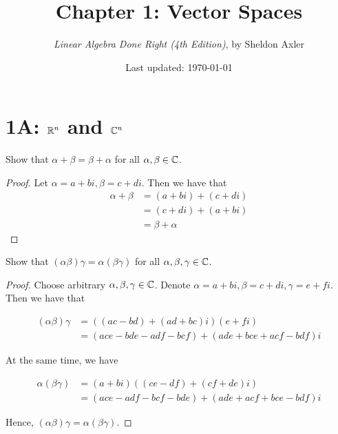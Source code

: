 \documentclass{extarticle}
\title{\vspace{-2em}Chapter 1: Vector Spaces}
\author{\emph{Linear Algebra Done Right (4th Edition)}, by Sheldon Axler}
\date{Last updated: \today}
\begin{document}
\maketitle 
\tableofcontents
\newpage

\section*{1A: $\mathbb{R}^n$ and $\mathbb{C}^n$}

\begin{problem}{1}
    Show that \(\alpha + \beta = \beta + \alpha\) for all \(\alpha, 
    \beta \in \mathbb{C}\). 
\end{problem}

\begin{proof}
    Let \(\alpha = a + bi, \beta = c + di\). Then we have that 
    \begin{align*}
        \alpha + \beta 
        &= (a + bi) + (c + di) \\ 
        &= (c + di) + (a + bi) \\ 
        &= \beta + \alpha
    \end{align*}
\end{proof}

\begin{problem}{3}
    Show that \((\alpha \beta) \gamma = \alpha(\beta \gamma)\) for all \(\alpha,
    \beta, \gamma \in \mathbb{C}\). 
\end{problem}

\begin{proof}
Choose arbitrary \(\alpha, \beta, \gamma \in \mathbb{C}\). Denote \(\alpha = a + bi,
\beta=c + di, \gamma = e + fi\). Then we have that 

\begin{align*}
    (\alpha \beta) \gamma 
    &= ((ac - bd) + (ad + bc)i ) (e + fi) \\ 
    &=( ace - bde - adf - bcf ) + (ade + bce + acf - bdf)i
\end{align*}

At the same time, we have 

\begin{align*}
    \alpha (\beta \gamma) 
    &= (a + bi)((ce - df) + (cf + de)i) \\ 
    &= (ace - adf - bcf - bde) + (ade + acf + bce - bdf)i
\end{align*}

Hence, \((\alpha \beta)\gamma = \alpha (\beta \gamma)\). 
\end{proof}
\end{document}
